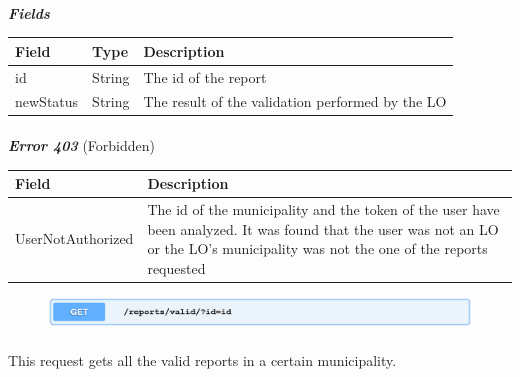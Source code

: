 						\paragraph{}
							\textcolor{myBlue}{\textit{\textbf{Fields}}}
							\vspace{-2mm}
							\begin{table}[!h]
								\begin{tabular}{L{0.2\textwidth}L{0.15\textwidth}L{0.53\textwidth}}
									\toprule
									\textbf{Field} & \textbf{Type} & \textbf{Description} \\
									\midrule
								 	id & String & The id of the report \\
								 	newStatus & String & The result of the validation performed by the LO \\
								 	\bottomrule
								\end{tabular}
							\end{table}
						\paragraph{}
							\textcolor{myRed}{\textit{\textbf{Error 403}}} (Forbidden)
							\vspace{-2mm}
							\begin{table}[!h]
								\begin{tabular}{L{0.3\textwidth}L{0.62\textwidth}}
									\toprule
									\textbf{Field} & \textbf{Description} \\
									\midrule
								  	UserNotAuthorized & The id of the municipality and the token of the user have been analyzed. It was found that the user was not an LO or the LO's municipality was not the one of the reports requested \\
								 	\bottomrule
								\end{tabular}
							\end{table}
							
						\clearpage
						\begin{figure}[!h]
							\includegraphics[width=\textwidth]{images/Restful/ValidReports}
						\end{figure}
						\paragraph{}
						\vspace{-7.5mm}
						This request gets all the valid reports in a certain municipality.

